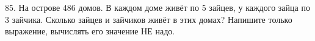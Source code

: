 85. На острове 486 домов. В каждом доме живёт по 5 зайцев, у каждого зайца по 3 зайчика. Сколько зайцев и зайчиков живёт в этих домах? Напишите только выражение, вычислять его значение НЕ надо.\\
